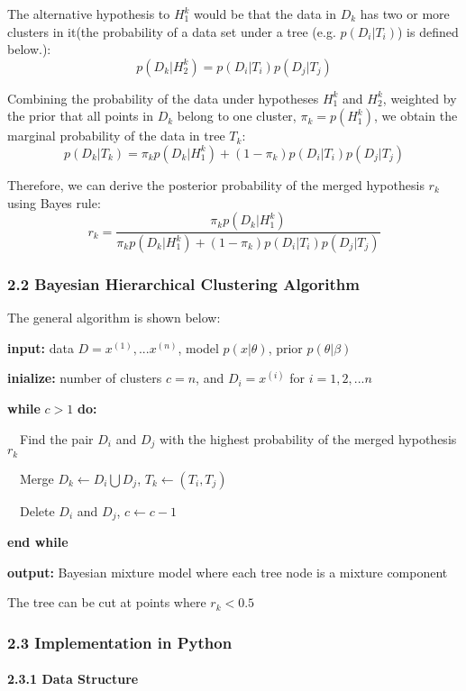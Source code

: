 \documentclass{article}
\begin{document}
The alternative hypothesis to $H_1^k$ would be that the data in $D_k$
has two or more clusters in it(the probability of a data set under a
tree (e.g. $p(D_i|T_i)$) is deﬁned below.):
\[p(D_k|H_2^k)=p(D_i|T_i)p(D_j|T_j)\]

Combining the probability of the data under hypotheses $H_1^k$ and
$H_2^k$, weighted by the prior that all points in $D_k$ belong to one
cluster, $\pi_k= p(H_1^k)$, we obtain the marginal probability of the
data in tree $T_k$:
\[p(D_k|T_k)=\pi_k p(D_k|H_1^k)+(1-\pi_k)p(D_i|T_i)p(D_j|T_j)\]

Therefore, we can derive the posterior probability of the merged
hypothesis $r_k$ using Bayes rule:
\[r_k=\frac{\pi_k p(D_k|H_1^k)}{\pi_k p(D_k|H_1^k)+(1-\pi_k)p(D_i|T_i)p(D_j|T_j)}\]

    \subsubsection{2.2 Bayesian Hierarchical Clustering
Algorithm}\label{bayesian-hierarchical-clustering-algorithm}

The general algorithm is shown below:

\textbf{input:} data $D={x^{(1)},...x^{(n)}}$, model $p(x|\theta)$,
prior $p(\theta|\beta)$

\textbf{inialize:} number of clusters $c=n$, and $D_i={x^{(i)}}$ for
$i=1,2,...n$

\textbf{while} $c>1$ \textbf{do:}

 Find the pair $D_i$ and $D_j$ with the highest probability of the
merged hypothesis $r_k$

 Merge $D_k\leftarrow D_i \bigcup D_j$, $T_k\leftarrow (T_i, T_j)$

 Delete $D_i$ and $D_j$, $c\leftarrow c-1$

\textbf{end while}

\textbf{output:} Bayesian mixture model where each tree node is a
mixture component

The tree can be cut at points where $r_k < 0.5$

    \subsubsection{2.3 Implementation in
Python}\label{implementation-in-python}

\paragraph{2.3.1 Data Structure}\label{data-structure}
\end{document}

